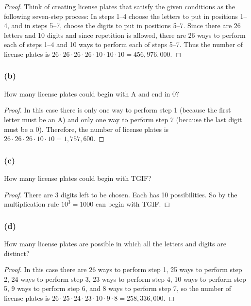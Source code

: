 \documentclass[14pt]{extarticle}
\begin{document}
\begin{proof}
Think of creating license plates that satisfy the given conditions as the following seven-step process: In steps 
1–4 choose the letters to put in positions 1–4, and in steps 5–7, choose the digits to put in positions 5–7. Since 
there are 26 letters and 10 digits and since repetition is allowed, there are 26 ways to perform each of steps 1–4 and 
10 ways to perform each of steps 5–7. Thus the number of license plates is \(26 \cdot 26 \cdot 26 \cdot 26 \cdot 10 
\cdot 10 \cdot 10 = 456,976,000\).
\end{proof}

\subsubsection{(b)}
How many license plates could begin with A and end in 0?
\begin{proof}
In this case there is only one way to perform step 1 (because the first letter must be an A) and only one way to 
perform step 7 (because the last digit must be a 0). Therefore, the number of license plates is 
\(26 \cdot 26 \cdot 26 \cdot 10 \cdot 10 = 1,757,600\).
\end{proof}

\subsubsection{(c)}
How many license plates could begin with TGIF?

\begin{proof}
There are 3 digits left to be chosen. Each has 10 possibilities. So by the multiplication rule \(10^3=1000\)
can begin with TGIF.
\end{proof}

\subsubsection{(d)}
How many license plates are possible in which all the letters and digits are distinct?

\begin{proof}
In this case there are 26 ways to perform step 1, 25 ways to perform step 2, 24 ways to perform step 3, 23 ways to 
perform step 4, 10 ways to perform step 5, 9 ways to perform step 6, and 8 ways to perform step 7, so the number 
of license plates is \(26 \cdot 25 \cdot 24 \cdot 23 \cdot 10 \cdot 9 \cdot 8 = 258,336,000\).
\end{proof}
\end{document}

